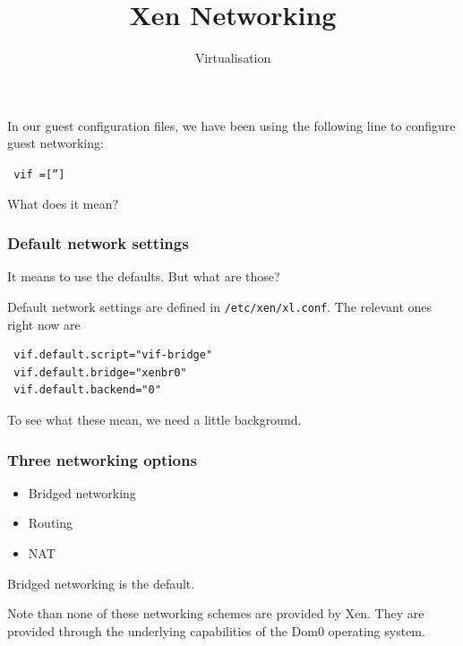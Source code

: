 \documentclass[10pt]{beamer}
\title{Xen Networking}
\author[I720]{Virtualisation}
\institute[Otago Polytechnic]{
  Otago Polytechnic \\
  Dunedin, New Zealand \\
}
\date{}
\begin{document}
\begin{frame}[plain]
  \titlepage
\end{frame}


\begin{frame}
  
  In our guest configuration files, we have been using the following line to configure guest networking:
  
  \vspace{5mm}
  
  \texttt{ vif =['']}
  
  \vspace{5mm}
  What does it mean?
  
  \end{frame}
  

\begin{frame}[fragile]
  \frametitle{Default network settings}
  
   It means to use the defaults. But what are those?
   
  \vspace{5mm}
  Default network settings are defined in \texttt{/etc/xen/xl.conf}. The relevant ones right now are
  
  \vspace{5mm}
  

\begin{verbatim}
 vif.default.script="vif-bridge"
 vif.default.bridge="xenbr0"
 vif.default.backend="0"
\end{verbatim}

\vspace{5mm}
To see what these mean, we need a little background.
\end{frame}

\begin{frame}
  \frametitle{Three networking options}
  
  \begin{itemize}
    \item Bridged networking
    \item Routing
    \item NAT
  \end{itemize}
  
  Bridged networking is the default.
  
  \vspace{5mm}
  Note than none of these networking schemes are provided by Xen. They are provided through
  the underlying capabilities of the Dom0 operating system.
  
  \end{frame}
\end{document}
